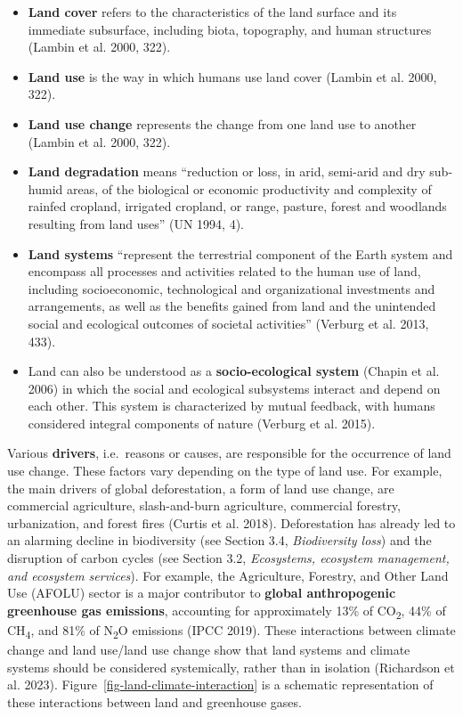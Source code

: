\documentclass[
  a4paper,
  DIV=11,
  numbers=noendperiod,
  oneside,
  openany]{scrreprt}
\begin{document}
\begin{itemize}
\item
  \textbf{Land cover} refers to the characteristics of the land surface
  and its immediate subsurface, including biota, topography, and human
  structures (Lambin et al. 2000, 322).
\item
  \textbf{Land use} is the way in which humans use land cover (Lambin et
  al. 2000, 322).
\item
  \textbf{Land use change} represents the change from one land use to
  another (Lambin et al. 2000, 322).
\item
  \textbf{Land degradation} means ``reduction or loss, in arid,
  semi-arid and dry sub-humid areas, of the biological or economic
  productivity and complexity of rainfed cropland, irrigated cropland,
  or range, pasture, forest and woodlands resulting from land uses'' (UN
  1994, 4).
\item
  \textbf{Land systems} ``represent the terrestrial component of the
  Earth system and encompass all processes and activities related to the
  human use of land, including socioeconomic, technological and
  organizational investments and arrangements, as well as the benefits
  gained from land and the unintended social and ecological outcomes of
  societal activities'' (Verburg et al. 2013, 433).
\item
  Land can also be understood as a \textbf{socio-ecological system}
  (Chapin et al. 2006) in which the social and ecological subsystems
  interact and depend on each other. This system is characterized by
  mutual feedback, with humans considered integral components of nature
  (Verburg et al. 2015).
\end{itemize}

Various \textbf{drivers}, i.e.~reasons or causes, are responsible for
the occurrence of land use change. These factors vary depending on the
type of land use. For example, the main drivers of global deforestation,
a form of land use change, are commercial agriculture, slash-and-burn
agriculture, commercial forestry, urbanization, and forest fires (Curtis
et al. 2018). Deforestation has already led to an alarming decline in
biodiversity (see Section 3.4, \emph{Biodiversity loss}) and the
disruption of carbon cycles (see Section 3.2, \emph{Ecosystems,
ecosystem management, and ecosystem services}). For example, the
Agriculture, Forestry, and Other Land Use (AFOLU) sector is a major
contributor to \textbf{global anthropogenic greenhouse gas emissions},
accounting for approximately 13\% of CO\textsubscript{2}, 44\% of
CH\textsubscript{4}, and 81\% of N\textsubscript{2}O emissions (IPCC
2019). These interactions between climate change and land use/land use
change show that land systems and climate systems should be considered
systemically, rather than in isolation (Richardson et al. 2023).
Figure~\ref{fig-land-climate-interaction} is a schematic representation
of these interactions between land and greenhouse gases.
\end{document}

